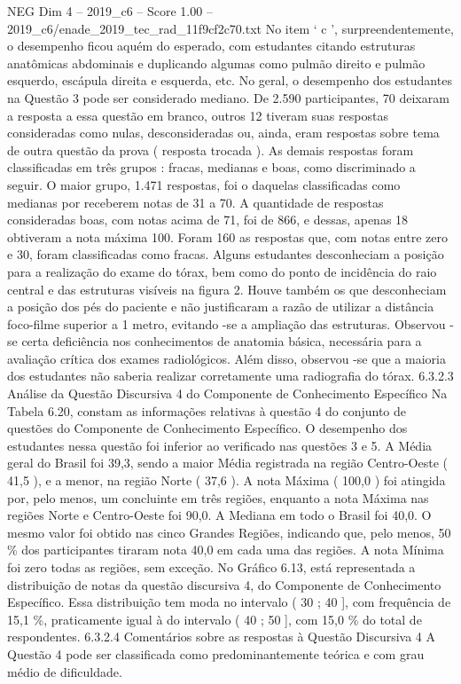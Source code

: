 \begin{textsample}{NEG Dim 4 – 2019\_c6 – Score 1.00 – 2019\_c6/enade\_2019\_tec\_rad\_11f9cf2c70.txt}
No item ‘ c ’, surpreendentemente, o desempenho ficou aquém do esperado, com estudantes citando estruturas anatômicas abdominais e duplicando algumas como pulmão direito e pulmão esquerdo, escápula direita e esquerda, etc.
No geral, o desempenho dos estudantes na Questão 3 pode ser considerado mediano.
De 2.590 participantes, 70 deixaram a resposta a essa questão em branco, outros 12 tiveram suas respostas consideradas como nulas, desconsideradas ou, ainda, eram respostas sobre tema de outra questão da prova ( resposta trocada ).
As demais respostas foram classificadas em três grupos : fracas, medianas e boas, como discriminado a seguir.
O maior grupo, 1.471 respostas, foi o daquelas classificadas como medianas por receberem notas de 31 a 70.
A quantidade de respostas consideradas boas, com notas acima de 71, foi de 866, e dessas, apenas 18 obtiveram a nota máxima 100.
Foram 160 as respostas que, com notas entre zero e 30, foram classificadas como fracas.
Alguns estudantes desconheciam a posição para a realização do exame do tórax, bem como do ponto de incidência do raio central e das estruturas visíveis na figura 2.
Houve também os que desconheciam a posição dos pés do paciente e não justificaram a razão de utilizar a distância foco-filme superior a 1 metro, evitando -se a ampliação das estruturas.
Observou -se certa deficiência nos conhecimentos de anatomia básica, necessária para a avaliação crítica dos exames radiológicos.
Além disso, observou -se que a maioria dos estudantes não saberia realizar corretamente uma radiografia do tórax. 6.3.2.3 Análise da Questão Discursiva 4 do Componente de Conhecimento Específico Na Tabela 6.20, constam as informações relativas à questão 4 do conjunto de questões do Componente de Conhecimento Específico.
O desempenho dos estudantes nessa questão foi inferior ao verificado nas questões 3 e 5.
A Média geral do Brasil foi 39,3, sendo a maior Média registrada na região Centro-Oeste ( 41,5 ), e a menor, na região Norte ( 37,6 ).
A nota Máxima ( 100,0 ) foi atingida por, pelo menos, um concluinte em três regiões, enquanto a nota Máxima nas regiões Norte e Centro-Oeste foi 90,0.
A Mediana em todo o Brasil foi 40,0.
O mesmo valor foi obtido nas cinco Grandes Regiões, indicando que, pelo menos, 50 \% dos participantes tiraram nota 40,0 em cada uma das regiões.
A nota Mínima foi zero todas as regiões, sem exceção.
No Gráfico 6.13, está representada a distribuição de notas da questão discursiva 4, do Componente de Conhecimento Específico.
Essa distribuição tem moda no intervalo ( 30 ; 40 ], com frequência de 15,1 \%, praticamente igual à do intervalo ( 40 ; 50 ], com 15,0 \% do total de respondentes. 6.3.2.4 Comentários sobre as respostas à Questão Discursiva 4 A Questão 4 pode ser classificada como predominantemente teórica e com grau médio de dificuldade.

\end{textsample}
